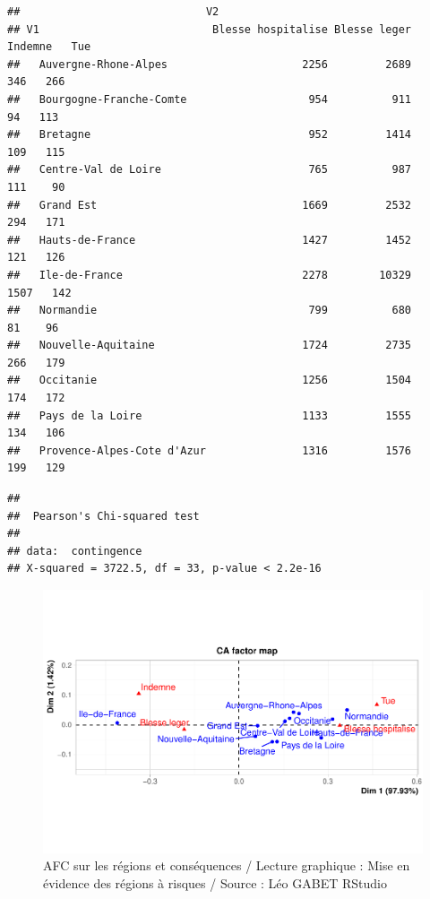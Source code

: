 \documentclass[french,]{compterendu}
\theoremstyle{urcastyle}
\theoremstyle{remark}
\begin{document}
\begin{verbatim}
##                             V2
## V1                           Blesse hospitalise Blesse leger Indemne   Tue
##   Auvergne-Rhone-Alpes                     2256         2689     346   266
##   Bourgogne-Franche-Comte                   954          911      94   113
##   Bretagne                                  952         1414     109   115
##   Centre-Val de Loire                       765          987     111    90
##   Grand Est                                1669         2532     294   171
##   Hauts-de-France                          1427         1452     121   126
##   Ile-de-France                            2278        10329    1507   142
##   Normandie                                 799          680      81    96
##   Nouvelle-Aquitaine                       1724         2735     266   179
##   Occitanie                                1256         1504     174   172
##   Pays de la Loire                         1133         1555     134   106
##   Provence-Alpes-Cote d'Azur               1316         1576     199   129
\end{verbatim}

\begin{verbatim}
## 
##  Pearson's Chi-squared test
## 
## data:  contingence
## X-squared = 3722.5, df = 33, p-value < 2.2e-16
\end{verbatim}

\begin{figure}[H]

{\centering \includegraphics[width=0.9\linewidth]{Rapport_ADD_LEO-GABET_files/figure-latex/afc1-1} 

}

\caption{AFC sur les régions et conséquences / Lecture graphique : Mise en évidence des régions à risques / Source : Léo GABET RStudio}\label{fig:afc1}
\end{figure}
\end{document}
